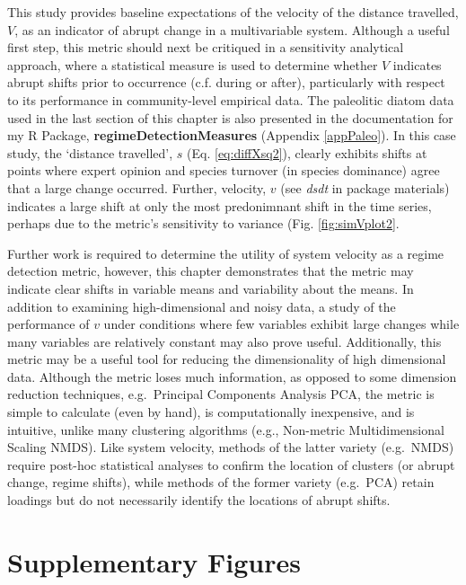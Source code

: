 \documentclass[12pt,twoside,openany]{reedthesis}
\begin{document}
This study provides baseline expectations of the velocity of the distance travelled, \(V\), as an indicator of abrupt change in a multivariable system. Although a useful first step, this metric should next be critiqued in a sensitivity analytical approach, where a statistical measure is used to determine whether \(V\) indicates abrupt shifts prior to occurrence (c.f. during or after), particularly with respect to its performance in community-level empirical data. The paleolitic diatom data used in the last section of this chapter is also presented in the documentation for my R Package, \textbf{regimeDetectionMeasures} (Appendix \ref{appPaleo}). In this case study, the `distance travelled', \(s\) (Eq. \eqref{eq:diffXsq2}), clearly exhibits shifts at points where expert opinion and species turnover (in species dominance) agree that a large change occurred. Further, velocity, \(v\) (see \emph{dsdt} in package materials) indicates a large shift at only the most predonimnant shift in the time series, perhaps due to the metric's sensitivity to variance (Fig. \ref{fig:simVplot2}.

Further work is required to determine the utility of system velocity as a regime detection metric, however, this chapter demonstrates that the metric may indicate clear shifts in variable means and variability about the means. In addition to examining high-dimensional and noisy data, a study of the performance of \(v\) under conditions where few variables exhibit large changes while many variables are relatively constant may also prove useful. Additionally, this metric may be a useful tool for reducing the dimensionality of high dimensional data. Although the metric loses much information, as opposed to some dimension reduction techniques, e.g.~Principal Components Analysis PCA, the metric is simple to calculate (even by hand), is computationally inexpensive, and is intuitive, unlike many clustering algorithms (e.g., Non-metric Multidimensional Scaling NMDS). Like system velocity, methods of the latter variety (e.g.~NMDS) require post-hoc statistical analyses to confirm the location of clusters (or abrupt change, regime shifts), while methods of the former variety (e.g.~PCA) retain loadings but do not necessarily identify the locations of abrupt shifts.

\hypertarget{supplementary-figures}{%
\section{Supplementary Figures}\label{supplementary-figures}}
\end{document}
